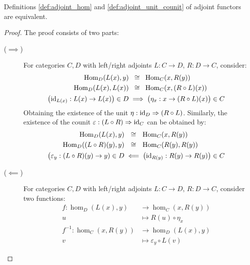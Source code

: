 \begin{theorem}
  Definitions \ref{def:adjoint_hom} and \ref{def:adjoint_unit_counit} of adjoint
  functors are equivalent.

  \begin{proof}
    The proof consists of two parts:
    \begin{description}
      \item[($\implies$)] For categories $C,D$ with left/right adjoints $L:C\to
        D$, $R:D\to C$, consider:
        \[
          \begin{aligned}
            \mathrm{Hom}_D(L(x), y) &\ \:\cong\ \: \mathrm{Hom}_C(x, R(y))\\
            \mathrm{Hom}_D(L(x), L(x)) &\ \:\cong\ \: \mathrm{Hom}_C(x, (R\circ L)(x))\\
            \big(\mathrm{id}_{L(x)}: L(x) \to L(x)\big) \in D
            &\implies \big(\eta_x : x \to (R\circ L)(x)\big)\in C
          \end{aligned}
        \]
        Obtaining the existence of the unit $\eta:\mathrm{id}_D\Rightarrow (R\circ L)$.
        Similarly, the existence of the counit $\varepsilon:(L\circ
        R)\Rightarrow\mathrm{id}_C$ can be obtained by:
        \[
          \begin{aligned}
            \mathrm{Hom}_D(L(x), y) &\ \ \cong\ \ \mathrm{Hom}_C(x, R(y))\\
            \mathrm{Hom}_D((L\circ R)(y), y) &\ \ \cong\ \ \mathrm{Hom}_C(R(y), R(y))\\
            \big(\varepsilon_{y} : (L\circ R)(y) \to y) \in D
            &\impliedby \big(\mathrm{id}_{R(y)}: R(y) \to R(y)\big) \in C
          \end{aligned}
        \]
      \item[($\impliedby$)] For categories $C,D$ with left/right adjoints
        $L:C\to D$, $R:D\to C$, consider two functions:
        \[
          \begin{aligned}
            f: \hom_D(L(x), y) &\to \hom_C(x, R(y))\\
            u &\mapsto R(u)\circ \eta_x\\
            f^{-1} : \hom_C(x, R(y)) &\to \hom_D(L(x), y)\\
            v &\mapsto \varepsilon_y \circ L(v)
          \end{aligned}
        \]
    \end{description}
  \end{proof}
\end{theorem}
